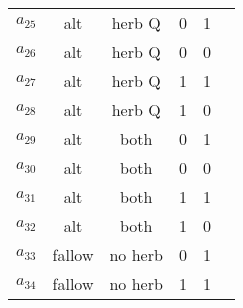 \documentclass[12pt, a4paper]{article}
\begin{document}
\begin{longtable}[h]{c c c c c c}
	$a_{25}$ & alt & herb Q & 0 & 1\\
	$a_{26}$ & alt & herb Q & 0 & 0\\
	$a_{27}$ & alt & herb Q & 1 & 1\\
	$a_{28}$ & alt & herb Q & 1 & 0\\
	$a_{29}$ & alt & both & 0 & 1\\
	$a_{30}$ & alt & both & 0 & 0\\
	$a_{31}$ & alt & both & 1 & 1\\
	$a_{32}$ & alt & both & 1 & 0\\
	$a_{33}$ & fallow & no herb & 0 & 1\\
	$a_{34}$ & fallow & no herb & 1 & 1\\
	\hline
\end{longtable}
\end{document}
